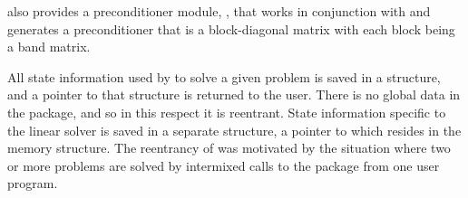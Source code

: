 {\idas} also provides a preconditioner module,
{\idabbdpre}, that works in conjunction with {\nvecp} and generates a 
preconditioner that is a block-diagonal matrix with each block being 
a band matrix.

All state information used by {\idas} to solve a given problem is saved
in a structure, and a pointer to that structure is returned to the
user.  There is no global data in the {\idas} package, and so in this
respect it is reentrant. State information specific to the linear
solver is saved in a separate structure, a pointer to which resides in
the {\idas} memory structure. The reentrancy of {\idas} was motivated
by the situation where two or more problems are solved by
intermixed calls to the package from one user program.

